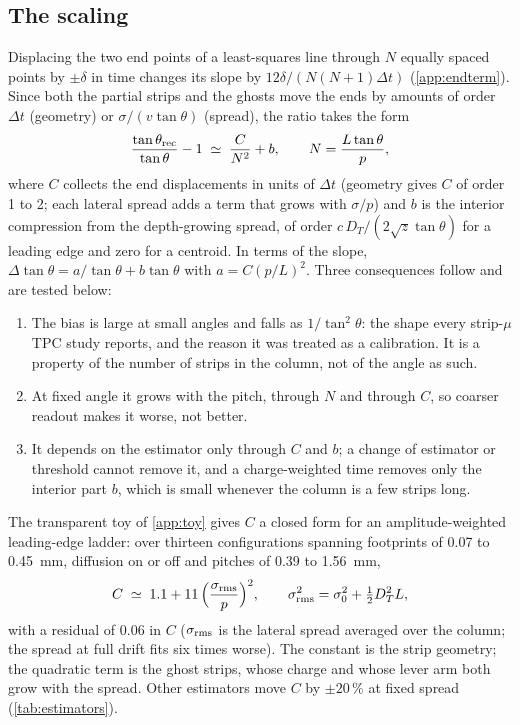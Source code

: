 \subsection{The scaling}\label{sec:scaling}

Displacing the two end points of a least-squares line through $N$ equally spaced points by $\pm\delta$ in time changes its
slope by $12\delta/(N(N+1)\Delta t)$ (\cref{app:endterm}). Since both the partial strips and the ghosts move the ends by
amounts of order $\Delta t$ (geometry) or $\sigma/(v\tan\theta)$ (spread), the ratio takes the form
\begin{equation}
  \frac{\tan\theta_{\rm rec}}{\tan\theta} - 1 \;\simeq\; \frac{C}{N^2} + b, \qquad N = \frac{L\tan\theta}{p},
  \label{eq:scaling}
\end{equation}
where $C$ collects the end displacements in units of $\Delta t$ (geometry gives $C$ of order 1 to 2; each lateral spread adds a
term that grows with $\sigma/p$) and $b$ is the interior compression from the depth-growing spread, of order
$c\,D_T/(2\sqrt{z}\tan\theta)$ for a leading edge and zero for a centroid. In terms of the slope, $\Delta\tan\theta = a/\tan\theta +
b\tan\theta$ with $a = C(p/L)^2$. Three consequences follow and are tested below:

\begin{enumerate}
\item The bias is large at small angles and falls as $1/\tan^2\theta$: the shape every strip-$\mu$TPC study reports, and the
  reason it was treated as a calibration. It is a property of the number of strips in the column, not of the angle as such.
\item At fixed angle it grows with the pitch, through $N$ and through $C$, so coarser readout makes it worse, not better.
\item It depends on the estimator only through $C$ and $b$; a change of estimator or threshold cannot remove it, and a
  charge-weighted time removes only the interior part $b$, which is small whenever the column is a few strips long.
\end{enumerate}

The transparent toy of \cref{app:toy} gives $C$ a closed form for an amplitude-weighted leading-edge ladder: over
thirteen configurations spanning footprints of 0.07 to \SI{0.45}{mm}, diffusion on or off and pitches of 0.39 to \SI{1.56}{mm},
\begin{equation}
  C \;\simeq\; 1.1 + 11\,\Big(\frac{\sigma_{\rm rms}}{p}\Big)^2, \qquad \sigma_{\rm rms}^2 = \sigma_0^2 + \tfrac{1}{2} D_T^2 L,
  \label{eq:Claw}
\end{equation}
with a residual of 0.06 in $C$ ($\sigma_{\rm rms}$ is the lateral spread averaged over the column; the spread at full drift
fits six times worse). The constant is the strip geometry; the quadratic term is the ghost strips, whose charge and whose lever
arm both grow with the spread. Other estimators move $C$ by $\pm 20\,\%$ at fixed spread (\cref{tab:estimators}).


